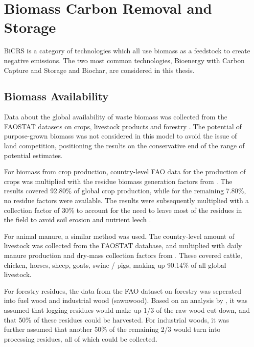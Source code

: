 \section{Biomass Carbon Removal and Storage}
BiCRS is a category of technologies which all use biomass as a feedstock to create negative emissions. The two most common technologies, Bioenergy with Carbon Capture and Storage and Biochar, are considered in this thesis.

\subsection{Biomass Availability}
Data about the global availability of waste biomass was collected from the FAOSTAT datasets on crops, livestock products and forestry \parencite{fao_faostat_2025, fao_faostat_2026}. The potential  of purpose-grown biomass was not considered in this model to avoid the issue of land competition, positioning the results on the conservative end of the range of potential estimates.\vspace{2mm}

For biomass from crop production, country-level FAO data for the production of crops was multiplied with the residue biomass generation factors from \textcite{lefebvre_biomass_2023}. The results covered 92.80\% of global crop production, while for the remaining 7.80\%, no residue factors were available. The results were subsequently multiplied with a collection factor of 30\% to account for the need to leave most of the residues in the field to avoid soil erosion and nutrient leech \parencite{battaglia_broad_2021}.\vspace{2mm}

For animal manure, a similar method was used. The country-level amount of livestock was collected from the FAOSTAT database, and multiplied with daily manure production and dry-mass collection factors from \textcite{lefebvre_biomass_2023}. These covered cattle, chicken, horses, sheep, goats, swine / pigs, making up 90.14\% of all global livestock.\vspace{2mm}

For forestry residues, the data from the FAO dataset on forestry was seperated into fuel wood and industrial wood (sawnwood). Based on an analysis by \textcite{koopmans_agricultural_1997}, it was assumed that logging residues would make up 1/3 of the raw wood cut down, and that 50\% of these residues could be harvested. For industrial woods, it was further assumed that another 50\% of the remaining 2/3 would turn into processing residues, all of which could be collected.

